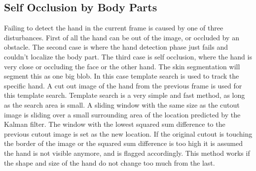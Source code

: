 







\subsection*{Self Occlusion by Body Parts}
Failing to detect the hand in the current frame is caused by one of three disturbances. First of all the hand can be out of the image, or occluded by an obstacle. The second case is where the hand detection phase just fails and couldn't localize the body part. The third case is self occlusion, where the hand is very close or occluding the face or the other hand. The skin segmentation will segment this as one big blob. In this case template search is used to track the specific hand. A cut out image of the hand from the previous frame is used for this template search. Template search is a very simple and fast method, as long as the search area is small. A sliding window  with the same size as the cutout image is sliding over a small surrounding area of the location predicted by the Kalman filter. The window with the lowest squared sum difference to the previous cutout image is set as the new location. If the original cutout is touching the border of the image or the squared sum difference is too high it is assumed the hand is not visible anymore, and is flagged accordingly. This method works if the shape and size of the hand do not change too much from the last.

